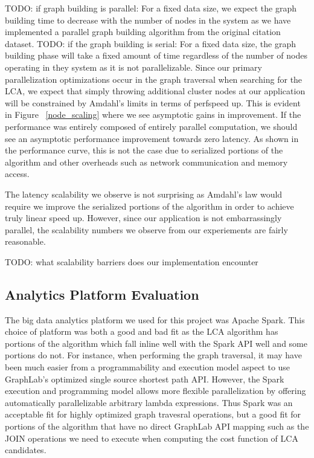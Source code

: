 \documentclass{article}
\begin{document}
TODO: if graph building is parallel: For a fixed data size, we expect the graph building time to decrease with the number of nodes in the system as we have implemented a parallel graph building algorithm from the original citation dataset.
TODO: if the graph building is serial: For a fixed data size, the graph building phase will take a fixed amount of time regardless of the number of nodes operating in they system as it is not parallelizable.
Since our primary parallelization optimizations occur in the graph traversal when searching for the LCA, we expect that simply throwing additional cluster nodes at our application will be constrained by Amdahl's limits in terms of  perfspeed up.
This is evident in Figure ~\ref{node_scaling} where we see asymptotic gains in improvement. 
If the performance was entirely composed of entirely parallel computation, we should see an asymptotic performance improvement towards zero latency.
As shown in the performance curve, this is not the case due to serialized portions of the algorithm and other overheads such as network communication and memory access.

The latency scalability we observe is not surprising as Amdahl's law would require we improve the serialized portions of the algorithm in order to achieve truly linear speed up.
However, since our application is not embarrassingly parallel, the scalability numbers we observe from our experiements are fairly reasonable.

TODO: what scalability barriers does our implementation encounter

\subsection{Analytics Platform Evaluation}

The big data analytics platform we used for this project was Apache Spark.
This choice of platform was both a good and bad fit as the LCA algorithm has portions of the algorithm which fall inline well with the Spark API well and some portions do not.
For instance, when performing the graph traversal, it may have been much easier from a programmability and execution model aspect to use GraphLab's optimized single source shortest path API.
However, the Spark execution and programming model allows more flexible parallelization by offering automatically parallelizable arbitrary lambda expressions.
Thus Spark was an acceptable fit for highly optimized graph travesral operations, but a good fit for portions of the algorithm that have no direct GraphLab API mapping such as the JOIN operations we need to execute when computing the cost function of LCA candidates.
\end{document}
